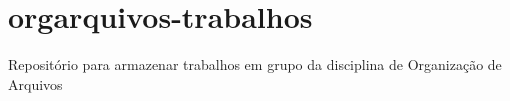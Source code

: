 \chapter{orgarquivos-\/trabalhos}
\hypertarget{index}{}\label{index}
\label{index_md_README}%
%
 Repositório para armazenar trabalhos em grupo da disciplina de Organização de Arquivos 